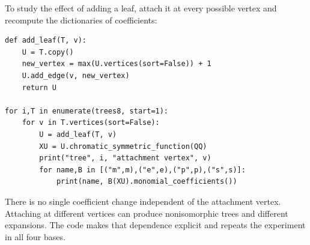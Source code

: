 \documentclass{article}
\begin{document}
\begin{enumerate}
To study the effect of adding a leaf, attach it at every possible
vertex and recompute the dictionaries of coefficients:
\begin{verbatim}
def add_leaf(T, v):
    U = T.copy()
    new_vertex = max(U.vertices(sort=False)) + 1
    U.add_edge(v, new_vertex)
    return U

for i,T in enumerate(trees8, start=1):
    for v in T.vertices(sort=False):
        U = add_leaf(T, v)
        XU = U.chromatic_symmetric_function(QQ)
        print("tree", i, "attachment vertex", v)
        for name,B in [("m",m),("e",e),("p",p),("s",s)]:
            print(name, B(XU).monomial_coefficients())
\end{verbatim}
There is no single coefficient change independent of the attachment
vertex.  Attaching at different vertices can produce nonisomorphic
trees and different expansions.  The code makes that dependence
explicit and repeats the experiment in all four bases.
\end{enumerate}
\end{document}
